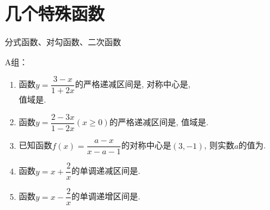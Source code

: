 \section{几个特殊函数}
\zsd 分式函数、对勾函数、二次函数

A组：

\begin{enumerate}
\item 函数$y=\dfrac{3-x}{1+2x}$的严格递减区间是, 对称中心是, \\
值域是. 

\item 函数$y=\dfrac{2-3x}{1-2x}(x\geq 0)$的严格递减区间是, 值域是\blkda[3]{$(-\infty,\frac{3}{2})\cup[2,+\infty)$}. 


\item 已知函数$f(x)=\dfrac{a-x}{x-a-1}$的对称中心是$(3,-1)$, 则实数$a$的值为. 

\item 函数$y=x+\dfrac{2}{x}$的单调递减区间是. 

\item 函数$y=x-\dfrac{2}{x}$的单调递增区间是. 

\end{enumerate}

